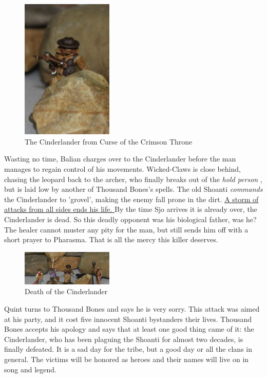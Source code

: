 \begin{figure}[h]
	\centering
	\includegraphics[width=0.39\textwidth]{images/The-Cinderlander-from-Curse-of-the-Crimson-Throne-603327133.jpg}
	\caption{The Cinderlander from Curse of the Crimson Throne}
	\label{fig:The-Cinderlander-from-Curse-of-the-Crimson-Throne-603327133}
\end{figure}

Wasting no time, Balian charges over to the Cinderlander before the man manages to regain control of his movements. Wicked-Claws is close behind, chasing the leopard back to the archer, who finally breaks out of the {\itshape hold person} , but is laid low by another of Thousand Bones's spells. The old Shoanti  {\itshape commands} the Cinderlander to 'grovel', making the enemy fall prone in the dirt. \hyperref[fig:Death-of-the-Cinderlander-603327730]{ A storm of attacks from all sides ends his life. } By the time Sjo arrives it is already over, the Cinderlander is dead. So this deadly opponent was his biological father, was he? The healer cannot muster any pity for the man, but still sends him off with a short prayer to Pharasma. That is all the mercy this killer deserves. \\

\begin{figure}[h]
	\centering
	\includegraphics[width=0.39\textwidth]{images/Death-of-the-Cinderlander-603327730.jpg}
	\caption{Death of the Cinderlander}
	\label{fig:Death-of-the-Cinderlander-603327730}
\end{figure}

Quint turns to Thousand Bones and says he is very sorry. This attack was aimed at his party, and it cost five innocent Shoanti bystanders their lives. Thousand Bones accepts his apology and says that at least one good thing came of it: the Cinderlander, who has been plaguing the Shoanti for almost two decades, is finally defeated. It is a sad day for the tribe, but a good day or all the clans in general. The victims will be honored as heroes and their names will live on in song and legend.\\

